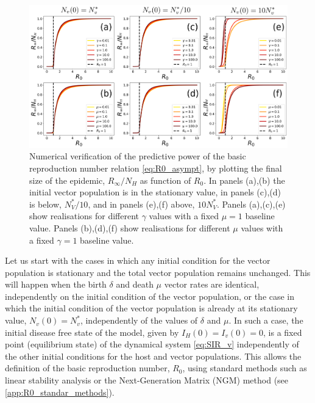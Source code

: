 \begin{figure}[t!]
    \centering
    \includegraphics[width=\textwidth]{Figures/R0_check_stationary.pdf}
    \caption{Numerical verification of the predictive  power of the basic
        reproduction number relation \cref{eq:R0_asympt}, by plotting the final
        size of
        the epidemic, $R_\infty/N_H$ as function of $R_0$. In panels (a),(b)
        the
        initial vector population is in the stationary value, in panels (c),(d)
        is
        below, $N_V^*/10$, and in panels (e),(f) above, $10 N_V^*$. Panels
        (a),(c),(e)
        show realisations for different $\gamma$ values with a fixed $\mu=1$
        baseline
        value. Panels (b),(d),(f) show realisations for different $\mu$ values
        with a
        fixed $\gamma=1$ baseline value.}
    \label{fig:R0_check_stationary}
\end{figure}

Let us start with the cases in which any initial condition for the vector
population is stationary  and the total vector population remains unchanged.
This will happen when the birth $\delta$ and death $\mu$ vector rates are
identical, independently on the initial condition of the vector population, or
the case in which the initial condition of the vector population is already at
its stationary value, $N_v(0)=N_v^*$, independently of the values of $\delta$
and $\mu$. In such a case, the initial disease free state of the model, given
by $I_H(0)=I_v(0)=0$, is a fixed point (equilibrium state) of the dynamical
system \cref{eq:SIR_v} independently of the other initial conditions for the
host and vector populations. This allows the definition of the basic
reproduction number, $R_0$, using standard methods such as linear stability
analysis or the Next-Generation Matrix (NGM) method \cite{Diekmann2010} (see
\cref{app:R0_standar_methods}).


